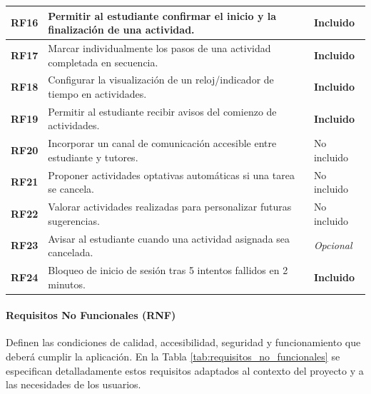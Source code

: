 \begin{xltabular}{\textwidth}{|p{2.2cm}|X|p{2.8cm}|}
\textbf{RF16} & Permitir al estudiante confirmar el inicio y la finalización de una actividad. & \textbf{Incluido} \\ \hline
\textbf{RF17} & Marcar individualmente los pasos de una actividad completada en secuencia. & \textbf{Incluido} \\ \hline
\textbf{RF18} & Configurar la visualización de un reloj/indicador de tiempo en actividades. & \textbf{Incluido} \\ \hline
\textbf{RF19} & Permitir al estudiante recibir avisos del comienzo de actividades. & \textbf{Incluido} \\ \hline
\textbf{RF20} & Incorporar un canal de comunicación accesible entre estudiante y tutores. & No incluido \\ \hline
\textbf{RF21} & Proponer actividades optativas automáticas si una tarea se cancela. & No incluido \\ \hline
\textbf{RF22} & Valorar actividades realizadas para personalizar futuras sugerencias. & No incluido \\ \hline
\textbf{RF23} & Avisar al estudiante cuando una actividad asignada sea cancelada. & \textit{Opcional} \\ \hline
\textbf{RF24} & Bloqueo de inicio de sesión tras 5 intentos fallidos en 2 minutos. & \textbf{Incluido} \\ \hline
\end{xltabular}

\vspace{0.6cm}

\paragraph{Requisitos No Funcionales (RNF)}
Definen las condiciones de calidad, accesibilidad, seguridad y funcionamiento que deberá cumplir la aplicación.
En la Tabla \ref{tab:requisitos_no_funcionales} se especifican detalladamente estos requisitos adaptados al contexto del proyecto y a las necesidades de los usuarios.

